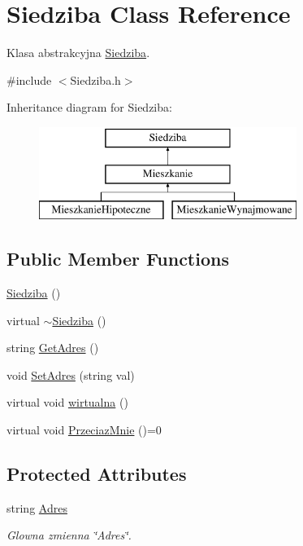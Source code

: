 \hypertarget{class_siedziba}{}\section{Siedziba Class Reference}
\label{class_siedziba}


Klasa abstrakcyjna \hyperlink{class_siedziba}{Siedziba}.  




{\ttfamily \#include $<$Siedziba.\+h$>$}

Inheritance diagram for Siedziba\+:\begin{figure}[H]
\begin{center}
\leavevmode
\includegraphics[height=3.000000cm]{class_siedziba}
\end{center}
\end{figure}
\subsection*{Public Member Functions}
\begin{DoxyCompactItemize}
\item 
\hyperlink{class_siedziba_a3d2babb95b8eae60c04eb73c9db0981c}{Siedziba} ()
\item 
virtual \hyperlink{class_siedziba_a1dc3fee9549a390981000aa8df28ee1e}{$\sim$\+Siedziba} ()
\item 
string \hyperlink{class_siedziba_a91a27ef9059b4984bdbc32baa5803bf3}{Get\+Adres} ()
\item 
void \hyperlink{class_siedziba_a93fede127dbc0264f7c31f3ea5059107}{Set\+Adres} (string val)
\item 
virtual void \hyperlink{class_siedziba_a263f6218be66b3291c2cc7c8b1c0ec07}{wirtualna} ()
\item 
virtual void \hyperlink{class_siedziba_aaaf836dbc2a5cb5afa25da87bc178a1c}{Przeciaz\+Mnie} ()=0
\end{DoxyCompactItemize}
\subsection*{Protected Attributes}
\begin{DoxyCompactItemize}
\item 
string \hyperlink{class_siedziba_a049d7c2791bac5877eb2133319197277}{Adres}\hypertarget{class_siedziba_a049d7c2791bac5877eb2133319197277}{}\label{class_siedziba_a049d7c2791bac5877eb2133319197277}

\begin{DoxyCompactList}\small\item\em Glowna zmienna \char`\"{}\+Adres\char`\"{}. \end{DoxyCompactList}\end{DoxyCompactItemize}
